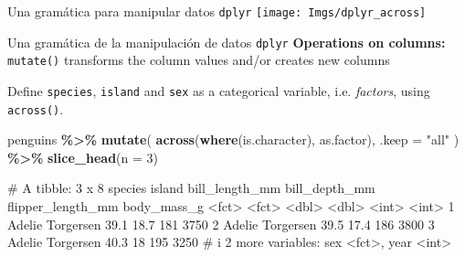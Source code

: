 \documentclass[
  ignorenonframetext,
  aspectratio=169]{beamer}
\newenvironment{Shaded}{\begin{snugshade}}{\end{snugshade}}
\newcommand{\AttributeTok}[1]{\textcolor[rgb]{0.13,0.29,0.53}{#1}}
\newcommand{\DecValTok}[1]{\textcolor[rgb]{0.00,0.00,0.81}{#1}}
\newcommand{\FunctionTok}[1]{\textcolor[rgb]{0.13,0.29,0.53}{\textbf{#1}}}
\newcommand{\NormalTok}[1]{#1}
\newcommand{\SpecialCharTok}[1]{\textcolor[rgb]{0.81,0.36,0.00}{\textbf{#1}}}
\newcommand{\StringTok}[1]{\textcolor[rgb]{0.31,0.60,0.02}{#1}}
\let\oldverbatim\verbatim
\let\endoldverbatim\endverbatim
\renewenvironment{verbatim}{\tiny\oldverbatim}{\endoldverbatim}
\begin{document}
\begin{frame}{Una gramática para manipular datos \texttt{dplyr}}
\label{una-gramuxe1tica-para-manipular-datos-dplyr-3}
\texttt{[image: Imgs/dplyr\_across]}
\end{frame}

\begin{frame}[fragile]{Una gramática de la manipulación de datos
\texttt{dplyr}}
\label{una-gramuxe1tica-de-la-manipulaciuxf3n-de-datos-dplyr-28}
\textbf{Operations on columns:} \texttt{mutate()} transforms the column
values and/or creates new columns

Define \texttt{species}, \texttt{island} and \texttt{sex} as a
categorical variable, i.e. \emph{factors}, using \texttt{across()}.

\begin{Shaded}
\begin{Highlighting}[]
\NormalTok{penguins }\SpecialCharTok{\%\textgreater{}\%} 
  \FunctionTok{mutate}\NormalTok{(}
    \FunctionTok{across}\NormalTok{(}\FunctionTok{where}\NormalTok{(is.character), as.factor),}
    \AttributeTok{.keep =} \StringTok{"all"}
\NormalTok{  ) }\SpecialCharTok{\%\textgreater{}\%} 
  \FunctionTok{slice\_head}\NormalTok{(}\AttributeTok{n =} \DecValTok{3}\NormalTok{)}
\end{Highlighting}
\end{Shaded}

\begin{verbatim}
# A tibble: 3 x 8
  species island    bill_length_mm bill_depth_mm flipper_length_mm body_mass_g
  <fct>   <fct>              <dbl>         <dbl>             <int>       <int>
1 Adelie  Torgersen           39.1          18.7               181        3750
2 Adelie  Torgersen           39.5          17.4               186        3800
3 Adelie  Torgersen           40.3          18                 195        3250
# i 2 more variables: sex <fct>, year <int>
\end{verbatim}
\end{frame}
\end{document}
